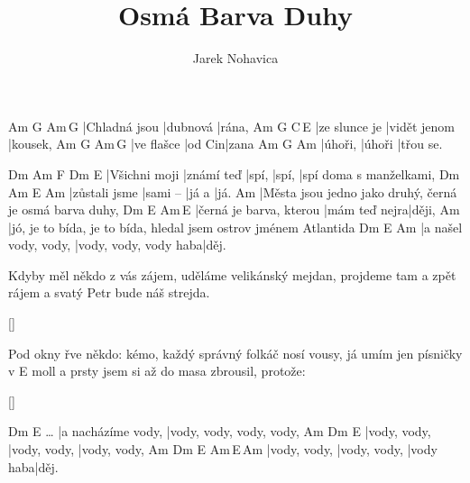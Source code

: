 \documentclass{song}
\author{Jarek Nohavica}
\title{Osmá Barva Duhy}
\begin{document}
\strophe
Am            G        Am\,G
|Chladná jsou |dubnová |rána,
Am            G            C\,E\7
|ze slunce je |vidět jenom |kousek,
Am         G      Am\,G
|ve flašce |od Cin|zana
Am      G      Am
|úhoři, |úhoři |třou se.
\endstrophe

Dm            Am         F     Dm    E\7
|Všichni moji |známí teď |spí, |spí, |spí doma s manželkami,
Dm            Am       E\7   Am
|zůstali jsme |sami -- |já a |já.
Am
|Města jsou jedno jako druhý, černá je osmá barva duhy,
Dm                      E\7           Am\,E\7
|černá je barva, kterou |mám teď nejra|ději,
Am
|jó, je to bída, je to bída, hledal jsem ostrov jménem Atlantida
Dm                   E\7                   Am
|a našel vody, vody, |vody, vody, vody haba|děj.
\endstrophe

\strophe*
Kdyby měl někdo z vás zájem,
uděláme velikánský mejdan,
projdeme tam a zpět rájem
a svatý Petr bude náš strejda.
\endstrophe

\ref{}

\strophe*
Pod okny řve někdo: kémo,
každý správný folkáč nosí vousy,
já umím jen písničky v E moll
a prsty jsem si až do masa zbrousil, protože:
\endstrophe

\ref{}

\strophe
         Dm                 E\7
\ldots{} |a nacházíme vody, |vody, vody, vody, vody,
Am           Dm           E\7
|vody, vody, |vody, vody, |vody, vody,
Am           Dm           E\7       Am\,E\7\,Am
|vody, vody, |vody, vody, |vody haba|děj.
\endstrophe
\end{document}
